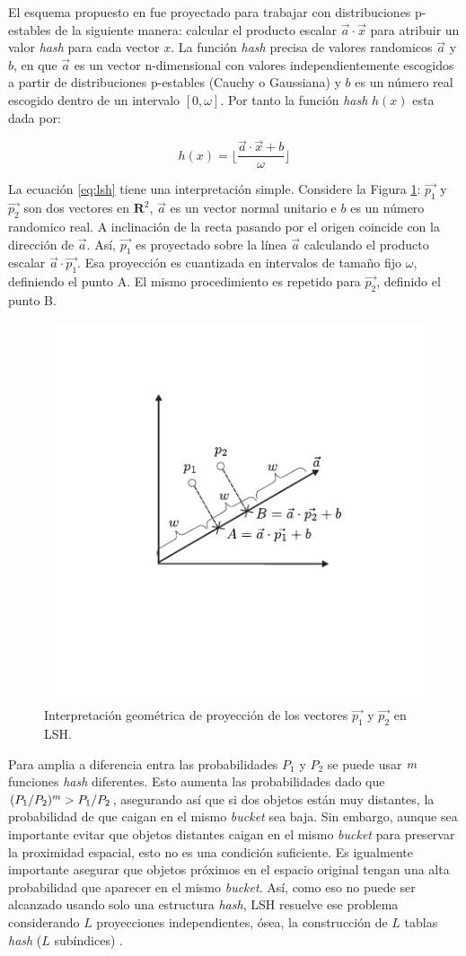 El esquema propuesto en \cite{Datar2004} fue proyectado para trabajar con distribuciones p-estables de la siguiente manera: calcular el producto escalar $\vec{a} \cdot \vec{x}$ para atribuir un valor \textit{hash} para cada vector $x$. La función  \textit{hash} precisa de valores randomicos $\vec{a}$ y $b$, en que $\vec{a}$ es un vector n-dimensional con valores independientemente escogidos a partir de distribuciones p-estables (Cauchy o Gaussiana) y $b$ es un número real escogido dentro de un intervalo $[0,\omega]$. Por tanto la función \textit{hash} $h(x)$ esta dada por:


\begin{equation}\label{eq:lsh}
    h(x) = \lfloor\frac{\vec{a} \cdot \vec{x} + b}{ \omega }\rfloor
\end{equation}

La ecuación \ref{eq:lsh} tiene una interpretación simple. Considere la Figura \ref{fig:quantization}: $\vec{p_1}$ y $\vec{p_2}$ son dos vectores en $\mathbf{R}^2$, $\vec{a}$ es un vector normal unitario e $b$ es un número randomico real. A inclinación de la recta pasando por el origen coincide con la dirección de $\vec{a}$. Así, $\vec{p_1}$  es proyectado sobre la línea $\vec{a}$  calculando el producto escalar  $\vec{a} \cdot \vec{p_1}$. Esa proyección es cuantizada en intervalos de tamaño fijo  $\omega$, definiendo el punto A. El mismo procedimiento es repetido para $\vec{p_2}$, definido el punto B.

\begin{figure}[htp]\centering
\includegraphics[width=0.3\columnwidth]{chapter2/lsh_projection.pdf}
\caption{Interpretación geométrica de proyección de los  vectores $\vec{p_1}$ y $\vec{p_2}$ en LSH.}
\label{fig:quantization}
\end{figure}

Para amplia a diferencia entra las probabilidades $P_1$ y $P_2$ se puede usar $m$ funciones \textit{hash} diferentes. Esto aumenta las probabilidades dado que \mbox{$(P_1/P_2)^m > P_1/P_2$}, asegurando así que si dos objetos están muy distantes, la probabilidad de que caigan en el mismo \textit{bucket} sea baja. Sin embargo, aunque sea importante evitar que objetos distantes caigan en el mismo \textit{bucket} para preservar la proximidad espacial, esto no es una condición suficiente. Es igualmente importante asegurar que objetos próximos en el espacio original tengan una alta probabilidad que aparecer en el mismo \textit{bucket}. Así, como eso no puede ser alcanzado usando solo una estructura \textit{hash}, LSH resuelve ese problema considerando $L$ proyecciones independientes, ósea, la construcción de $L$ tablas \textit{hash} ($L$ subíndices) \cite{lshtutorial,taoLSBLSH}.

